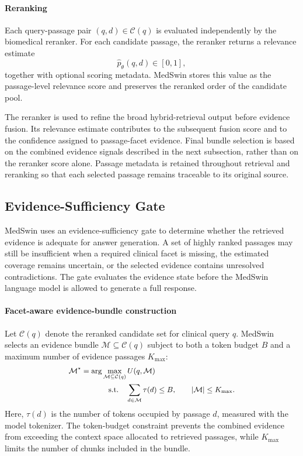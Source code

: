 \documentclass[conference]{IEEEtran}
\begin{document}
\paragraph{Reranking}
Each query-passage pair \((q,d)\in\mathcal{C}(q)\) is evaluated independently by the biomedical reranker. For each candidate passage, the reranker returns a relevance estimate
\[
\widehat{p}_{\theta}(q,d)\in[0,1],
\]
together with optional scoring metadata. MedSwin stores this value as the passage-level relevance score and preserves the reranked order of the candidate pool.

The reranker is used to refine the broad hybrid-retrieval output before evidence fusion. Its relevance estimate contributes to the subsequent fusion score and to the confidence assigned to passage-facet evidence. Final bundle selection is based on the combined evidence signals described in the next subsection, rather than on the reranker score alone. Passage metadata is retained throughout retrieval and reranking so that each selected passage remains traceable to its original source.


\subsection{Evidence-Sufficiency Gate}
\label{sec:sufficiency-gate}
MedSwin uses an evidence-sufficiency gate to determine whether the retrieved evidence is adequate for answer generation. A set of highly ranked passages may still be insufficient when a required clinical facet is missing, the estimated coverage remains uncertain, or the selected evidence contains unresolved contradictions. The gate evaluates the evidence state before the MedSwin language model is allowed to generate a full response.

\paragraph{Facet-aware evidence-bundle construction}
Let \(\mathcal{C}(q)\) denote the reranked candidate set for clinical query \(q\). MedSwin selects an evidence bundle \(\mathcal{M}\subseteq\mathcal{C}(q)\) subject to both a token budget \(B\) and a maximum number of evidence passages \(K_{\max}\):
\begin{equation}
\label{eq:evidence-bundle-selection}
\small
\begin{aligned}
\mathcal{M}^{\star}
=
\arg\max_{\mathcal{M}\subseteq\mathcal{C}(q)}
&\,U(q,\mathcal{M})\\
\text{s.t.}\quad
&\sum_{d\in\mathcal{M}}\tau(d)\leq B,
\qquad
|\mathcal{M}|\leq K_{\max}.
\end{aligned}
\end{equation}
Here, \(\tau(d)\) is the number of tokens occupied by passage \(d\), measured with the model tokenizer. The token-budget constraint prevents the combined evidence from exceeding the context space allocated to retrieved passages, while \(K_{\max}\) limits the number of chunks included in the bundle.
\end{document}
